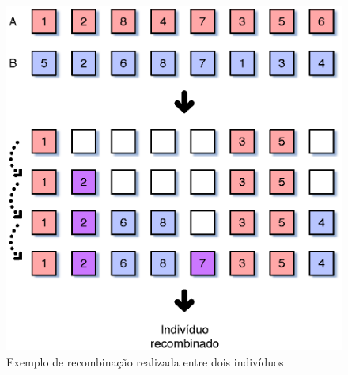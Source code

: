 \begin{figure}
  \centering
  \includegraphics[scale=0.67]{recomb-op}
  \caption{Exemplo de recombinação realizada entre dois
    indivíduos\label{fig:recomb-op}}
\end{figure}


